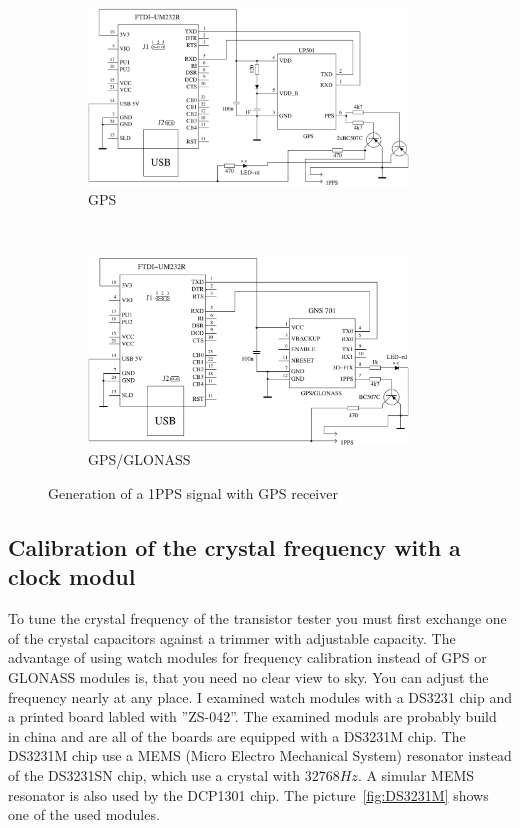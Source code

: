 \begin{figure}[H]
  \begin{subfigure}[b]{9cm}
    \centering
    \includegraphics[width=8.5cm]{../FIG/GPS_UP501.pdf}
    \caption{GPS}
  \end{subfigure}
  ~
  \begin{subfigure}[b]{9cm}
    \centering
    \includegraphics[width=8.5cm]{../FIG/GPS_GNS701.pdf}
    \caption{GPS/GLONASS}
  \end{subfigure}
  \caption{Generation of a 1PPS signal with GPS receiver }
  \label{fig:GPS-1PPS}
\end{figure}

\subsection{Calibration of the crystal frequency with a clock modul}

To tune the crystal frequency of the transistor tester you must first exchange one of the
crystal capacitors against a trimmer with adjustable capacity.
The advantage of using watch modules for frequency calibration instead of GPS or GLONASS modules is,
that you need no clear view to sky. You can adjust the frequency nearly at any place.
I examined watch modules with a DS3231 chip and a printed board labled with ''ZS-042''.
The examined moduls are probably build in china and are all of the boards are equipped
with a DS3231M chip. The DS3231M chip use a MEMS (Micro Electro Mechanical System) resonator 
instead of the DS3231SN chip, which use a crystal with \(32768Hz\).
A simular MEMS resonator is also used by the DCP1301 chip.
The picture~\ref{fig:DS3231M} shows one of the used modules.

